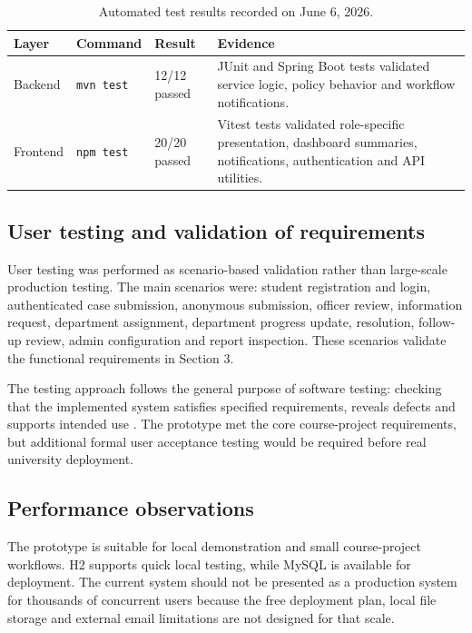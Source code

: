 \documentclass[11pt,a4paper]{article}
\begin{document}
\begin{table}[H]
\centering
\small
\begin{tabularx}{\textwidth}{p{}p{}p{}Y}
\toprule
Layer & Command & Result & Evidence\\
\midrule
Backend & \texttt{mvn test} & 12/12 passed & JUnit and Spring Boot tests validated service logic, policy behavior and workflow notifications.\\
Frontend & \texttt{npm test} & 20/20 passed & Vitest tests validated role-specific presentation, dashboard summaries, notifications, authentication and API utilities.\\
\bottomrule
\end{tabularx}
\caption{Automated test results recorded on June 6, 2026.}
\end{table}

\subsection{User testing and validation of requirements}
User testing was performed as scenario-based validation rather than large-scale production testing. The main scenarios were: student registration and login, authenticated case submission, anonymous submission, officer review, information request, department assignment, department progress update, resolution, follow-up review, admin configuration and report inspection. These scenarios validate the functional requirements in Section 3.

The testing approach follows the general purpose of software testing: checking that the implemented system satisfies specified requirements, reveals defects and supports intended use \cite{ISO29119Testing}. The prototype met the core course-project requirements, but additional formal user acceptance testing would be required before real university deployment.

\subsection{Performance observations}
The prototype is suitable for local demonstration and small course-project workflows. H2 supports quick local testing, while MySQL is available for deployment. The current system should not be presented as a production system for thousands of concurrent users because the free deployment plan, local file storage and external email limitations are not designed for that scale.
\end{document}
